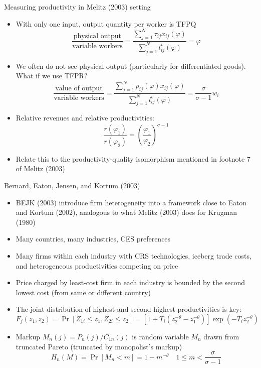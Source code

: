 \documentclass[10pt,notes=hide]{beamer}
\begin{document}
\begin{frame}{Measuring productivity in Melitz (2003) setting}
\begin{itemize}
\item With only one input, output quantity per worker is TFPQ
\begin{equation*}
\frac{\text{physical output}}{\text{variable workers}}
=
\frac{\sum_{j=1}^{N}\tau _{ij}x_{ij}\left(\varphi\right)}
{\sum_{j=1}^{N}l_{ij}^{v}\left(\varphi\right) }
=
\varphi
\end{equation*}
\item We often do not see physical output (particularly for differentiated goods).
What if we use TFPR?
\begin{equation*}
\frac{\text{value of output}}{\text{variable workers}}
=\frac{\sum_{j=1}^{N}p_{ij}\left(\varphi\right) x_{ij}\left(\varphi\right)}
	{\sum_{j=1}^{N}l_{ij}^{v}\left(\varphi\right)}
=\frac{\sigma}{\sigma-1} w_{i}
\end{equation*}
\item Relative revenues and relative productivities:
\begin{equation*}
\frac{r(\varphi_1)}{r(\varphi_2)} = \left(\frac{\varphi_1}{\varphi_2}\right)^{\sigma-1}
\end{equation*}
\item Relate this to the productivity-quality isomorphism mentioned in footnote 7 of Melitz (2003)
\end{itemize}
\end{frame}
\begin{frame}{Bernard, Eaton, Jensen, and Kortum (2003)}
\begin{itemize}
\item BEJK (2003) introduce firm heterogeneity into a framework close to Eaton and Kortum (2002), analogous to what Melitz (2003) does for Krugman (1980)
\item Many countries, many industries, CES preferences
\item Many firms within each industry with CRS technologies, iceberg trade costs, and heterogeneous productivities competing on price
\item Price charged by least-cost firm in each industry is bounded by the second lowest cost (from same or different country)
\item The joint distribution of highest and second-highest productivities is key:
\begin{equation*}
F_j(z_1,z_2)
=
\Pr\left[Z_{1i}\leq z_1, Z_{2i}\leq z_2 \right]
=
\left[1+T_i\left(z_2^{-\theta} - z_1^{-\theta}\right)\right]\exp\left(-T_iz_2^{-\theta}\right)
\end{equation*}
\item Markup $M_n(j) = P_n(j)/C_{1n}(j)$ is random variable $M_n$ drawn from truncated Pareto (truncated by monopolist's markup)
\begin{equation*}
	H_n(M) = \Pr[M_n <m] = 1 -m^{-\theta} \quad 1 \leq m < \frac{\sigma}{\sigma-1}
\end{equation*}
\end{itemize}
\end{frame}
\end{document}
